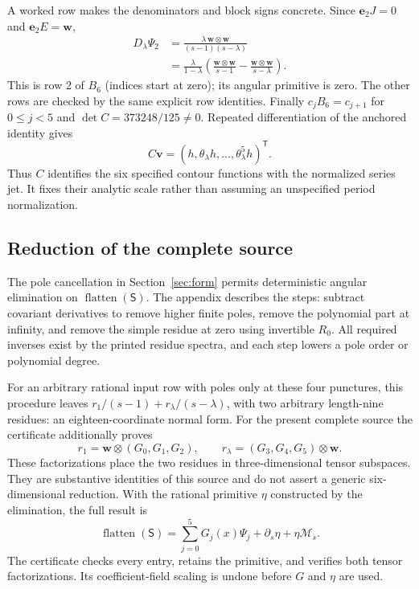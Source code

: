 \documentclass[11pt,a4paper]{article}
\newcommand{\tr}{\mathsf T}
\newcommand{\e}{\mathbf e}
\newcommand{\vv}{\mathbf v}
\newcommand{\ww}{\mathbf w}
\begin{document}
A worked row makes the denominators and block signs concrete. Since
$\e_2J=0$ and $\e_2E=\ww$,
\begin{align*}
 D_\lambda\Psi_2
 &=\frac{\lambda\,\ww\otimes\ww}{(s-1)(s-\lambda)}\\
 &=\frac{\lambda}{1-\lambda}
       \left(\frac{\ww\otimes\ww}{s-1}
                  -\frac{\ww\otimes\ww}{s-\lambda}\right).
\end{align*}
This is row 2 of $B_6$ (indices start at zero); its angular primitive is
zero. The other rows are checked by the same explicit row identities.
Finally $c_jB_6=c_{j+1}$ for $0\leq j<5$ and
$\det C=373248/125\ne0$. Repeated differentiation of the anchored
identity gives
\begin{equation}\label{eq:cyclic-state}
 C\vv=(h,\theta_\lambda h,\ldots,\theta_\lambda^5h)^{\tr}.
\end{equation}
Thus $C$ identifies the six specified contour functions with the
normalized series jet. It fixes their analytic scale rather than
assuming an unspecified period normalization.

\subsection{Reduction of the complete source}
The pole cancellation in Section~\ref{sec:form} permits deterministic
angular elimination on $\operatorname{flatten}(\mathsf S)$.
The appendix describes the steps: subtract covariant derivatives to
remove higher finite poles, remove the polynomial part at infinity,
and remove the simple residue at zero using invertible $R_0$.
All required inverses exist by the printed residue spectra, and each
step lowers a pole order or polynomial degree.

For an arbitrary rational input row with poles only at these four punctures,
this procedure leaves
$r_1/(s-1)+r_\lambda/(s-\lambda)$, with two arbitrary length-nine
residues: an eighteen-coordinate normal form. For the present complete
source the certificate additionally proves
\[
 r_1=\ww\otimes(G_0,G_1,G_2),\qquad
 r_\lambda=(G_3,G_4,G_5)\otimes\ww.
\]
These factorizations place the two residues in three-dimensional tensor
subspaces. They are substantive identities of this source and do not
assert a generic six-dimensional reduction.
With the rational primitive $\eta$ constructed by the elimination,
the full result is
\begin{equation}\label{eq:source-nf}
 \operatorname{flatten}(\mathsf S)
   =\sum_{j=0}^5G_j(x)\Psi_j+\partial_s\eta+\eta\mathcal M_s.
\end{equation}
The certificate checks every entry, retains the primitive, and verifies
both tensor factorizations. Its coefficient-field scaling is undone
before $G$ and $\eta$ are used.
\end{document}
